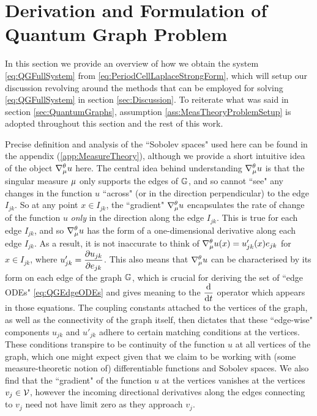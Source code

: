 \section{Derivation and Formulation of Quantum Graph Problem} \label{sec:SystemDerivation}

In this section we provide an overview of how we obtain the system \eqref{eq:QGFullSystem} from \eqref{eq:PeriodCellLaplaceStrongForm}, which will setup our discussion revolving around the methods that can be employed for solving \eqref{eq:QGFullSystem} in section \ref{sec:Discussion}.
To reiterate what was said in section \ref{sec:QuantumGraphs}, assumption \ref{ass:MeasTheoryProblemSetup} is adopted throughout this section and the rest of this work. \newline

Precise definition and analysis of the ``Sobolev spaces" used here can be found in the appendix (\ref{app:MeasureTheory}), although we provide a short intuitive idea of the object $\nabla^{\theta}_{\mu}u$ here.
The central idea behind understanding $\nabla^{\theta}_{\mu}u$ is that the singular measure $\mu$ only supports the edges of $\mathbb{G}$, and so cannot ``see" any changes in the function $u$ ``across" (or in the direction perpendicular) to the edge $I_{jk}$.
So at any point $x\in I_{jk}$, the ``gradient" $\nabla^{\theta}_{\mu}u$ encapsulates the rate of change of the function $u$ \emph{only} in the direction along the edge $I_{jk}$.
This is true for each edge $I_{jk}$, and so $\nabla^{\theta}_{\mu}u$ has the form of a one-dimensional derivative along each edge $I_{jk}$.
As a result, it is not inaccurate to think of $\nabla^{\theta}_{\mu}u(x) = u_{jk}'(x)e_{jk}$ for $x\in I_{jk}$, where $u_{jk}' = \dfrac{\partial u_{jk}}{\partial e_{jk}}$.
This also means that $\nabla^{\theta}_{\mu}u$ can be characterised by its form on each edge of the graph $\mathbb{G}$, which is crucial for deriving the set of ``edge ODEs" \eqref{eq:QGEdgeODEs} and gives meaning to the $\dfrac{\mathrm{d}}{\mathrm{d}t}$ operator which appears in those equations.
The coupling constants attached to the vertices of the graph, as well as the connectivity of the graph itself, then dictates that these ``edge-wise" components $u_{jk}$ and $u'_{jk}$ adhere to certain matching conditions at the vertices.
These conditions transpire to be continuity of the function $u$ at all vertices of the graph, which one might expect given that we claim to be working with (some measure-theoretic notion of) differentiable functions and Sobolev spaces.
We also find that the ``gradient" of the function $u$ at the vertices vanishes at the vertices $v_j\in\mathcal{V}$, however the incoming directional derivatives along the edges connecting to $v_j$ need not have limit zero as they approach $v_j$.
